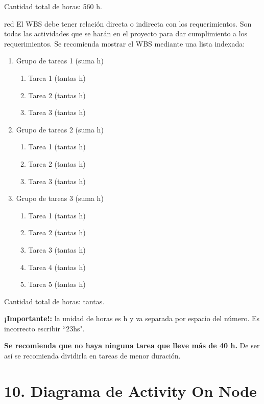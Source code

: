 \documentclass[
11pt, %
]{charter}
\begin{document}
Cantidad total de horas: 560 h.

\begin{consigna}{red}
El WBS debe tener relación directa o indirecta con los requerimientos.  Son todas las actividades que se harán en el proyecto para dar cumplimiento a los requerimientos. Se recomienda mostrar el WBS mediante una lista indexada:

\begin{enumerate}
\item Grupo de tareas 1 (suma h)
	\begin{enumerate}
	\item Tarea 1 (tantas h)
	\item Tarea 2 (tantas h)
	\item Tarea 3 (tantas h)
	\end{enumerate}
\item Grupo de tareas 2 (suma h)
	\begin{enumerate}
	\item Tarea 1 (tantas h)
	\item Tarea 2 (tantas h)
	\item Tarea 3 (tantas h)
	\end{enumerate}
\item Grupo de tareas 3 (suma h)
	\begin{enumerate}
	\item Tarea 1 (tantas h)
	\item Tarea 2 (tantas h)
	\item Tarea 3 (tantas h)
	\item Tarea 4 (tantas h)
	\item Tarea 5 (tantas h)
	\end{enumerate}
\end{enumerate}

Cantidad total de horas: tantas.

\textbf{¡Importante!:} la unidad de horas es h y va separada por espacio del número. Es incorrecto escribir ``23hs".

\textbf{Se recomienda que no haya ninguna tarea que lleve más de 40 h.} De ser así se recomienda dividirla en tareas de menor duración.

\end{consigna}

\section{10. Diagrama de Activity On Node}
\label{sec:AoN}
\end{document}
